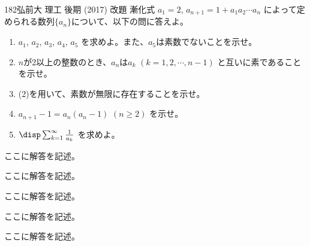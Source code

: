 \begin{prob}{182}{}{弘前大 理工 後期 (2017) 改題}
 漸化式 $a_1=2$, $a_{n+1}=1+a_1a_2\cdots a_n$ によって定められる数列$\{a_n\}$について、以下の問に答えよ。
 \begin{enumerate}
  \item $a_1$, $a_2$, $a_3$, $a_4$, $a_5$ を求めよ。また、$a_5$は素数でないことを示せ。
  \item $n$が2以上の整数のとき、$a_n$は$a_k$ $(k=1, 2, \cdots, n-1)$ と互いに素であることを示せ。
  \item (2)を用いて、素数が無限に存在することを示せ。
  \item $a_{n+1}-1=a_n(a_n-1)$ $(n\ge 2)$ を示せ。
  \item $\disp \sum_{k=1}^\infty \frac{1}{a_k}$ を求めよ。
 \end{enumerate}
\end{prob}
ここに解答を記述。

ここに解答を記述。

ここに解答を記述。

ここに解答を記述。

ここに解答を記述。